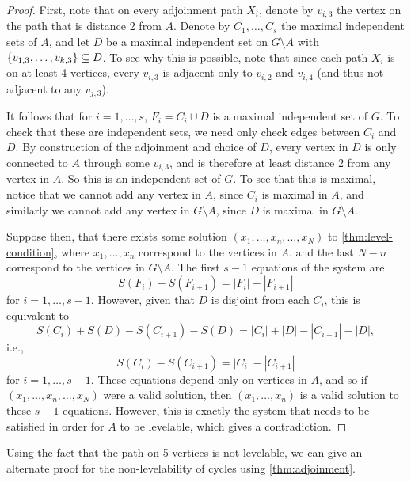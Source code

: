 \begin{proof}
First, note that on every adjoinment path $X_i$, denote by $v_{i, 3}$ the vertex on the path that is distance 2 from $A$. Denote by $C_1, \dots, C_s$ the maximal independent sets of $A$, and let $D$ be a maximal independent set on $G \setminus A$ with $\{ v_{1,3}, \dots, v_{k,3} \} \subseteq D$. To see why this is possible, note that since each path $X_i$ is on at least 4 vertices, every $v_{i,3}$ is adjacent only to $v_{i, 2}$ and $v_{i, 4}$ (and thus not adjacent to any $v_{j,3}$). 

It follows that for $i = 1, \dots, s$, $F_i = C_i \cup D$ is a maximal independent set of $G$. To check that these are independent sets, we need only check edges between $C_i$ and $D$. By construction of the adjoinment and choice of $D$, every vertex in $D$ is only connected to $A$ through some $v_{i, 3}$, and is therefore at least distance 2 from any vertex in $A$. So this is an independent set of $G$. To see that this is maximal, notice that we cannot add any vertex in $A$, since $C_i$ is maximal in $A$, and similarly we cannot add any vertex in $G \setminus A$, since $D$ is maximal in $G \setminus A$. 

Suppose then, that there exists some solution $(x_1, \dots, x_n, \dots, x_{N})$ to \autoref{thm:level-condition}, where $x_1, \dots, x_n$ correspond to the vertices in $A$. and the last $N-n$ correspond to the vertices in $G \setminus A$. The first $s-1$ equations of the system are
\begin{equation*}
S(F_i) - S(F_{i+1}) = |F_i| - |F_{i+1}|
\end{equation*}
for $i = 1, \dots, s-1$. However, given that $D$ is disjoint from each $C_i$, this is equivalent to
\begin{equation*}
S(C_i) + S(D) - S(C_{i+1}) - S(D) = |C_{i}| + |D| - |C_{i+1}| - |D|,
\end{equation*}
i.e.,
\begin{equation*}
S(C_i) - S(C_{i+1}) = |C_{i}|  - |C_{i+1}|
\end{equation*}
for $i = 1, \dots, s-1$. These equations depend only on vertices in $A$, and so if $(x_1, \dots, x_n, \dots, x_N)$ were a valid solution, then $(x_1, \dots, x_n)$ is a valid solution to these $s-1$ equations. However, this is exactly the system that needs to be satisfied in order for $A$ to be levelable, which gives a contradiction.
\end{proof}

Using the fact that the path on 5 vertices is not levelable, we can give an alternate proof for the non-levelability of cycles using \autoref{thm:adjoinment}.

